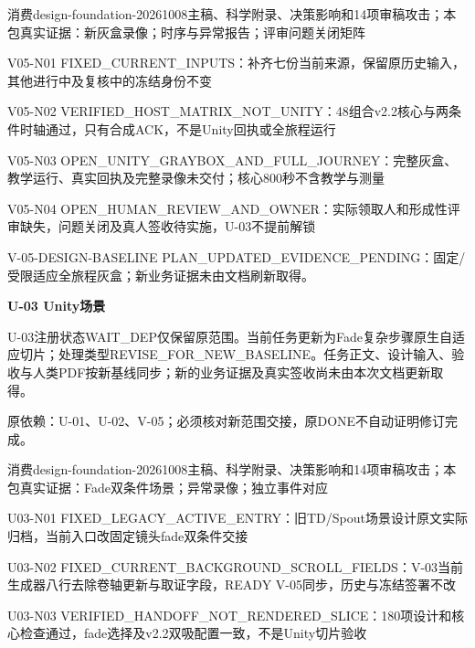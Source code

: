 \documentclass[11pt,a4paper]{article}
\newcommand{\reviewsection}[1]{\par\Needspace{5\baselineskip}\vspace{10pt}\begin{center}{\titlelatin\titlecjk\bfseries\fontsize{14}{20}\selectfont #1}\end{center}}
\begin{document}
消费design-\allowbreak{}foundation-\allowbreak{}20261008主稿、科学附录、决策影响和14项审稿攻击；本包真实证据：新灰盒录像；时序与异常报告；评审问题关闭矩阵


V05-\allowbreak{}N01 FIXED\_\allowbreak{}CURRENT\_\allowbreak{}INPUTS：补齐七份当前来源，保留原历史输入，其他进行中及复核中的冻结身份不变


V05-\allowbreak{}N02 VERIFIED\_\allowbreak{}HOST\_\allowbreak{}MATRIX\_\allowbreak{}NOT\_\allowbreak{}UNITY：48组合v2.2核心与两条件时轴通过，只有合成ACK，不是Unity回执或全旅程运行


V05-\allowbreak{}N03 OPEN\_\allowbreak{}UNITY\_\allowbreak{}GRAYBOX\_\allowbreak{}AND\_\allowbreak{}FULL\_\allowbreak{}JOURNEY：完整灰盒、教学运行、真实回执及完整录像未交付；核心800秒不含教学与测量


V05-\allowbreak{}N04 OPEN\_\allowbreak{}HUMAN\_\allowbreak{}REVIEW\_\allowbreak{}AND\_\allowbreak{}OWNER：实际领取人和形成性评审缺失，问题关闭及真人签收待实施，U-\allowbreak{}03不提前解锁


V-\allowbreak{}05-\allowbreak{}DESIGN-\allowbreak{}BASELINE PLAN\_\allowbreak{}UPDATED\_\allowbreak{}EVIDENCE\_\allowbreak{}PENDING：固定/\allowbreak{}受限适应全旅程灰盒；新业务证据未由文档刷新取得。


\reviewsection{U-\allowbreak{}03 Unity场景}
U-\allowbreak{}03注册状态WAIT\_\allowbreak{}DEP仅保留原范围。当前任务更新为Fade复杂步骤原生自适应切片；处理类型REVISE\_\allowbreak{}FOR\_\allowbreak{}NEW\_\allowbreak{}BASELINE。任务正文、设计输入、验收与人类PDF按新基线同步；新的业务证据及真实签收尚未由本次文档更新取得。


原依赖：U-\allowbreak{}01、U-\allowbreak{}02、V-\allowbreak{}05；必须核对新范围交接，原DONE不自动证明修订完成。


消费design-\allowbreak{}foundation-\allowbreak{}20261008主稿、科学附录、决策影响和14项审稿攻击；本包真实证据：Fade双条件场景；异常录像；独立事件对应


U03-\allowbreak{}N01 FIXED\_\allowbreak{}LEGACY\_\allowbreak{}ACTIVE\_\allowbreak{}ENTRY：旧TD/\allowbreak{}Spout场景设计原文实际归档，当前入口改固定镜头fade双条件交接


U03-\allowbreak{}N02 FIXED\_\allowbreak{}CURRENT\_\allowbreak{}BACKGROUND\_\allowbreak{}SCROLL\_\allowbreak{}FIELDS：V-\allowbreak{}03当前生成器八行去除卷轴更新与取证字段，READY V-\allowbreak{}05同步，历史与冻结签署不改


U03-\allowbreak{}N03 VERIFIED\_\allowbreak{}HANDOFF\_\allowbreak{}NOT\_\allowbreak{}RENDERED\_\allowbreak{}SLICE：180项设计和核心检查通过，fade选择及v2.2双吸配置一致，不是Unity切片验收
\end{document}
